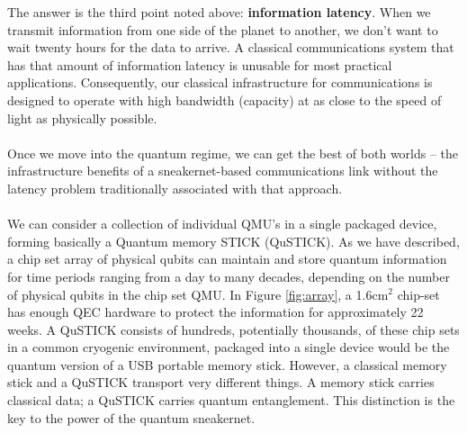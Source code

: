 \documentclass[aps,prl,twocolumn,10pt,nofootinbib]{revtex4}
\begin{document}
The answer is the third point noted above: {\bf information latency}.  When we transmit information from one side of the planet to another, we don't want to wait twenty hours for the data to arrive.  A classical communications system that has that amount of information latency is unusable for most practical applications.  Consequently, our classical infrastructure for communications is designed to operate with high bandwidth (capacity) at as close to the speed of light as physically possible.  
\\
\\
Once we move into the quantum regime, we can get the best of both worlds -- the  infrastructure benefits of a sneakernet-based communications link without the latency problem traditionally associated with that approach.  
\\
\\
We can consider a collection of individual QMU's in a single packaged device, forming basically a Quantum memory STICK (QuSTICK).  As we have described, a chip set array of physical qubits can maintain and store quantum information for time periods ranging from a day to many decades, depending on the number of physical qubits in the chip set QMU.  In Figure \ref{fig:array}, a 1.6cm$^2$ chip-set has enough QEC hardware to protect the information for approximately 22 weeks.  A QuSTICK consists of hundreds, potentially thousands, of these chip sets in a common cryogenic environment, packaged into a single device would be the quantum version of a USB portable memory stick.  However, a classical memory stick and a QuSTICK transport very different things.  A memory stick carries classical data; a QuSTICK carries quantum entanglement.  This distinction is the key to the power of the quantum sneakernet. 
\\
\\
\end{document}

